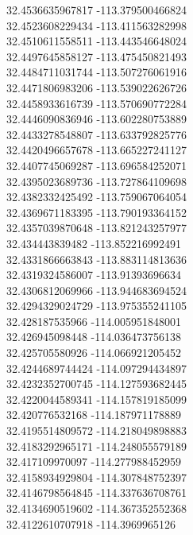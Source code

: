 {32.4536635967817	-113.379500466824\\
32.4523608229434	-113.411563282998\\
32.4510611558511	-113.443546648024\\
32.4497645858127	-113.475450821493\\
32.4484711031744	-113.507276061916\\
32.4471806983206	-113.539022626726\\
32.4458933616739	-113.570690772284\\
32.4446090836946	-113.602280753889\\
32.4433278548807	-113.633792825776\\
32.4420496657678	-113.665227241127\\
32.4407745069287	-113.696584252071\\
32.4395023689736	-113.727864109698\\
32.4382332425492	-113.759067064054\\
32.4369671183395	-113.790193364152\\
32.4357039870648	-113.821243257977\\
32.434443839482	-113.852216992491\\
32.4331866663843	-113.883114813636\\
32.4319324586007	-113.91393696634\\
32.4306812069966	-113.944683694524\\
32.4294329024729	-113.975355241105\\
32.428187535966	-114.005951848001\\
32.426945098448	-114.036473756138\\
32.425705580926	-114.066921205452\\
32.4244689744424	-114.097294434897\\
32.4232352700745	-114.127593682445\\
32.4220044589341	-114.157819185099\\
32.420776532168	-114.187971178889\\
32.4195514809572	-114.218049898883\\
32.4183292965171	-114.248055579189\\
32.417109970097	-114.277988452959\\
32.4158934929804	-114.307848752397\\
32.4146798564845	-114.337636708761\\
32.4134690519602	-114.367352552368\\
32.4122610707918	-114.3969965126\\
}
